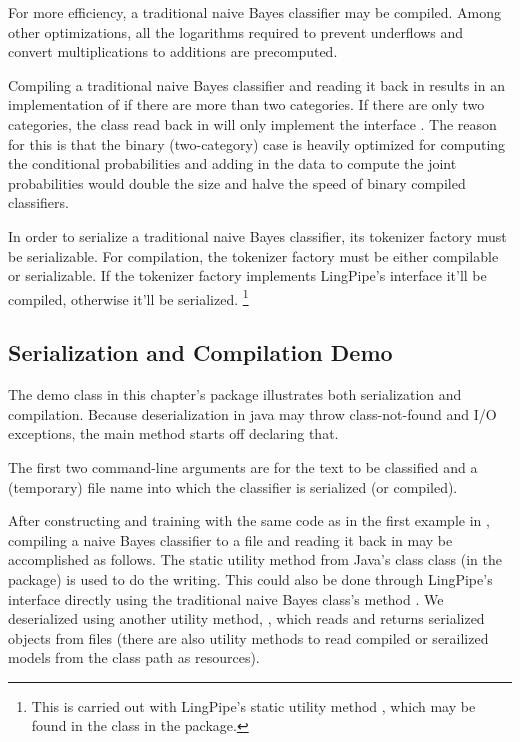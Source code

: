 For more efficiency, a traditional naive Bayes classifier may be
compiled.  Among other optimizations, all the logarithms required
to prevent underflows and convert multiplications to additions
are precomputed.  

Compiling a traditional naive Bayes classifier and reading it back in
results in an implementation of 
if there are more than two categories.  If there are only two
categories, the class read back in will only implement the interface
.  The reason for this is
that the binary (two-category) case is heavily optimized for computing
the conditional probabilities and adding in the data to compute the
joint probabilities would double the size and halve the speed of
binary compiled classifiers.

In order to serialize a traditional naive Bayes classifier, its
tokenizer factory must be serializable.  For compilation, the
tokenizer factory must be either compilable or serializable.  If
the tokenizer factory implements LingPipe's  interface
it'll be compiled, otherwise it'll be serialized.%
%
\footnote{This is carried out with LingPipe's static utility method
  , which may be found in the
   class in the 
  package.}

\subsection{Serialization and Compilation Demo}

The demo class  in this chapter's package
illustrates both serialization and compilation.  Because
deserialization in java may throw class-not-found and I/O exceptions,
the main method starts off declaring that.
%

The first two command-line arguments are for the text to be classified
and a (temporary) file name into which the classifier is serialized
(or compiled).

After constructing and training with the same code as in the first
example in , compiling a naive Bayes
classifier to a file and reading it back in may be accomplished as
follows.
%
%
The static utility method  from Java's class
 class (in the  package) is
used to do the writing.  This could also be done through LingPipe's
 interface directly using the traditional naive Bayes
class's method .  We deserialized using
another utility method, , which reads and returns
serialized objects from files (there are also utility methods to read
compiled or serailized models from the class path as resources).

